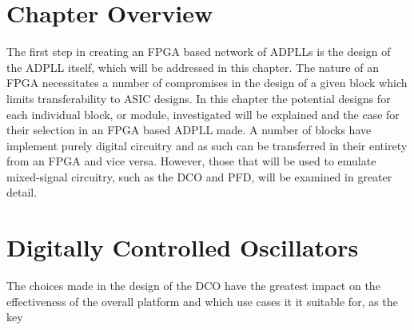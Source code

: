 \section{Chapter Overview}
The first step in creating an \ac{FPGA} based network of \ac{ADPLL}s is the design of the \ac{ADPLL} itself, which will be addressed in this chapter. The nature of an \ac{FPGA} necessitates a number of compromises in the design of a given block which limits transferability to \ac{ASIC} designs. In this chapter the potential designs for each individual block, or module, investigated will be explained and the case for their selection in an \ac{FPGA} based \ac{ADPLL} made. A number of blocks have implement purely digital circuitry and as such can be transferred in their entirety from an \ac{FPGA} and vice versa. However, those that will be used to emulate mixed-signal circuitry, such as the \ac{DCO} and \ac{PFD}, will be examined in greater detail.
\section{Digitally Controlled Oscillators}
The choices made in the design of the \ac{DCO} have the greatest impact on the effectiveness of the overall platform and which use cases it it suitable for, as the key 